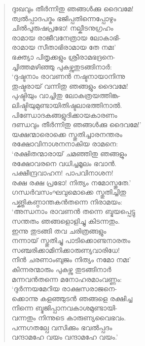 \begin{verse}
ദുഃഖവും തീര്‍ന്നിതു ഞങ്ങള്‍ക്കു ദൈവമേ!\\
ത്വല്‍പ്പാദപദ്മം ഭജിപ്പതിന്നെപ്പോഴും\\
ചില്‍പുരുഷപ്രഭോ! നല്കീടനുഗ്രഹം\\
രാമായ രാജീവനേത്രായ ലോകാഭി-\\
രാമായ സീതാഭിരാമായ തേ നമഃ’\\
ഭക്ത്യാ പിതൃക്കളും ശ്രീരാമഭദ്രനെ-\\
ച്ചിത്തമഴിഞ്ഞു പുകഴ്ന്നുതുടങ്ങിനാര്‍:\\
‘ദുഷ്ടനാം രാവണന്‍ നഷ്ടനായാനിന്നു\\
തുഷ്ടരായ് വന്നിതു ഞങ്ങളും ദൈവമേ!\\
പുഷ്ടിയും വാച്ചിതു ലോകത്രയത്തിങ്ക-\\
ലിഷ്ടിയുമുണ്ടായിതിഷ്ടലാഭത്തിനാല്‍.\\
പിണ്ഡോദകങ്ങളുദിക്കായകാരണം\\
ദണ്ഡവും തീര്‍ന്നിതു ഞങ്ങള്‍ക്കു ദൈവമേ!’\\
യക്ഷന്മാരൊക്കെ സ്തുതിച്ചാരനന്തരം\\
രക്ഷോവിനാശനനാകിയ രാമനെ:\\
‘രക്ഷിതന്മാരായ് ചമഞ്ഞിതു ഞങ്ങളും\\
രക്ഷോവരനെ വധിച്ചമൂലം ഭവാന്‍.\\
പക്ഷീന്ദ്രവാഹന! പാപവിനാശന!\\
രക്ഷ രക്ഷ പ്രഭോ! നിത്യം നമോസ്തുതേ.’\\
ഗന്ധര്‍വസംഘവുമൊക്കെ സ്തുതിച്ചിതു\\
പങ്ക്തികണ്ഠാന്തകന്‍തന്നെ നിരാമയം:\\
‘അന്ധനാം രാവണന്‍ തന്നെ ബ്ഭയപ്പെട്ടു\\
സന്തതം ഞങ്ങളൊളിച്ചു കിടന്നതും.\\
ഇന്നു തുടങ്ങി തവ ചരിത്രങ്ങളും\\
നന്നായ് സ്തുതിച്ചു പാടിക്കൊണ്ടനാരതം\\
സഞ്ചരിക്കാമിനിക്കാരുണ്യവാരിധേ!\\
നിന്‍ ചരണാംബുജം നിത്യം നമോ നമഃ’\\
കിന്നരന്മാരും പുകഴ്ന്നു തുടങ്ങിനാര്‍\\
മന്നവന്‍തന്നെ മനോഹരമാംവണ്ണം:\\
‘ദുര്‍ന്നയമേറിയ രാക്ഷസരാജനെ-\\
ക്കൊന്നു കളഞ്ഞുടന്‍ ഞങ്ങളെ രക്ഷിച്ച\\
നിന്നെ ബ്ഭജിപ്പാനവകാശമുണ്ടായി-\\
വന്നതും നിന്നുടെ കാരുണ്യവൈഭവം.\\
പന്നഗതല്പേ വസിക്കും ഭവല്‍പ്പദം\\
വന്ദാമഹേ വയം വന്ദാമഹേ വയം.’\\

\end{verse}
